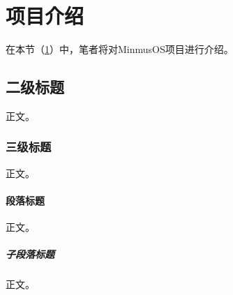 \section{项目介绍}\label{sec:ProjectIntroduction}

在本节（\cref{sec:ProjectIntroduction}）中，笔者将对MinmusOS项目进行介绍。

\subsection{二级标题}

正文。

\subsubsection{三级标题}

正文。

\paragraph{段落标题}

正文。

\subparagraph{子段落标题}

正文。